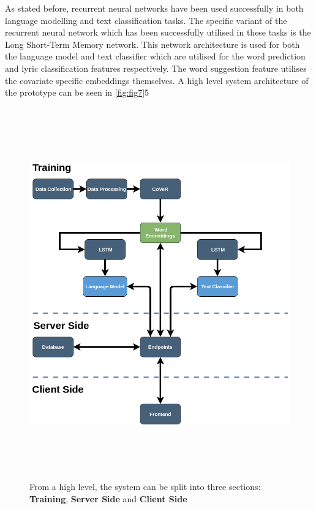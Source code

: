 \noindent
\newline
As stated before, recurrent neural networks have been used successfully in both language modelling and text classification tasks. The specific variant of the recurrent neural network which has been successfully utilised in these tasks is the Long Short-Term Memory network. This network architecture is used for both the language model and text classifier which are utilised for the word prediction and lyric classification features respectively. The word suggestion feature utilises the covariate specific embeddings themselves. A high level system architecture of the prototype can be seen in \autoref{fig:fig7}5
\begin{figure}[h]	
	\includegraphics[width=15cm, height=16cm]{./figures/fig7}
	\centering
	\caption[SONGIFAI: High Level Architecture]{From a high level, the system can be split into three sections: \textbf{Training}, \textbf{Server Side} and \textbf{Client Side}}
	\label{fig:fig7}
\end{figure}
